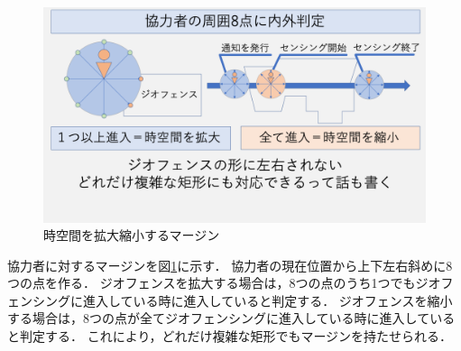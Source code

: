 \begin{figure}[tbh]
    \centering
    \includegraphics[width=16cm]{img_margin_2.png}
    \caption{時空間を拡大縮小するマージン}
    \label{fig:margin_2}
\end{figure}

協力者に対するマージンを図\ref{fig:margin_2}に示す．
協力者の現在位置から上下左右斜めに8つの点を作る．
ジオフェンスを拡大する場合は，8つの点のうち1つでもジオフェンシングに進入している時に進入していると判定する．
ジオフェンスを縮小する場合は，8つの点が全てジオフェンシングに進入している時に進入していると判定する．
これにより，どれだけ複雑な矩形でもマージンを持たせられる．






